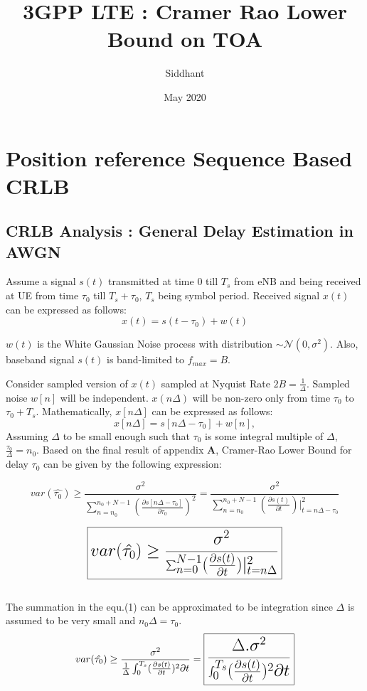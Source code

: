 \documentclass{article}
\title{\LARGE 3GPP LTE : Cramer Rao Lower Bound on TOA}
\author{Siddhant}
\date{May 2020}
\begin{document}
\maketitle
\section{\LARGE Position reference Sequence Based CRLB}

\subsection{CRLB Analysis : General Delay Estimation in AWGN}
Assume a signal $s(t)$ transmitted at time $0$ till $T_s$ from eNB and being received at UE from time $\tau_0$ till $T_s+\tau_0$, $T_s$ being symbol period. Received signal $x(t)$ can be expressed as follows:
$$x(t) = s(t - \tau_0) + w(t)$$

$w(t)$ is the White Gaussian Noise process with distribution $\sim \mathcal N (0, \sigma^2)$. Also, baseband signal $s(t)$ is band-limited to $f_{max}=B$.

Consider sampled version of $x(t)$ sampled at Nyquist Rate $2B = \frac{1}{\Delta}$. Sampled noise $w[n]$ will be independent. $x(n\Delta)$ will be non-zero only from time $\tau_0$ to $\tau_0 + T_s$. Mathematically, $x[n\Delta]$ can be expressed as follows:
$$x[n\Delta] = s[n\Delta - \tau_0] + w[n],$$
Assuming $\Delta$ to be small enough such that $\tau_0$ is some integral multiple of $\Delta$, $\frac{\tau_0}{\Delta} = n_0$.
Based on the final result of appendix $\mathbf{A}$, Cramer-Rao Lower Bound for delay $\tau_0$ can be given by the following expression:

$$
var(\hat{\tau_0}) \ge \frac{\sigma^2}{\sum^{n_0+N-1}_{n=n_0}(\frac{\partial s[n\Delta - \tau_0]}{\partial \tau_0 })^2} = \frac{\sigma^2}{\sum^{n_0+N-1}_{n=n_0}(\frac{\partial s(t)}{\partial t})| ^2 _{t=n\Delta - \tau_0}}
$$

\begin{equation} \label{eq1}
\LARGE
\boxed{var(\hat{\tau_0}) \ge \frac{\sigma^2}{\sum^{N-1}_{n=0}(\frac{\partial s(t)}{\partial t})| ^2 _{t=n\Delta}}}
\end{equation}
\\
The summation in the equ.(1) can be approximated to be integration since $\Delta$ is assumed to be very small and $n_0\Delta = \tau_0$. 
\begin{equation} \label{eq2} \LARGE
var(\hat{\tau_0}) \ge \frac{\sigma^2}{\frac{1}{\Delta} \int^{T_s}_{0}(\frac{\partial s(t)}{\partial t})^2 \partial t} = \boxed{\frac{\Delta. \sigma^2}{\int^{T_s}_{0}(\frac{\partial s(t)}{\partial t})^2 \partial t}}
\end{equation}
\end{document}
